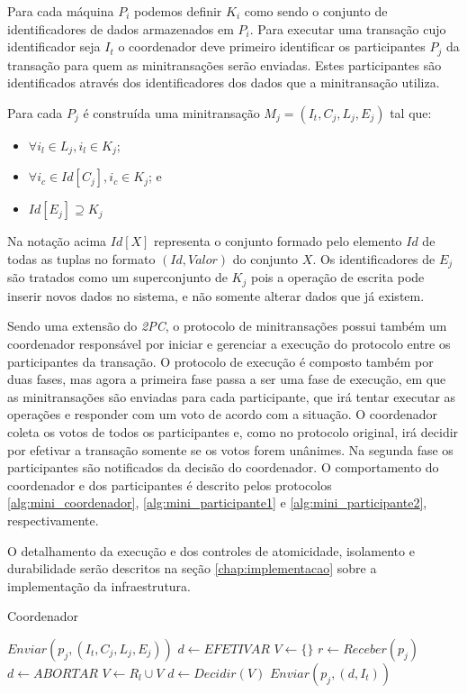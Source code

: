 \documentclass[11pt,twoside,a4paper]{book}
\begin{document}
Para cada máquina \(P_i\) podemos definir \(K_i\) como sendo o conjunto de identificadores de dados armazenados em \(P_i\). Para executar uma transação cujo identificador seja \(I_t\) o coordenador deve primeiro identificar os participantes \(P_j\) da transação para quem as minitransações serão enviadas. Estes participantes são identificados através dos identificadores dos dados que a minitransação utiliza.

Para cada \(P_j\) é construída uma minitransação \(M_j = (I_t, C_j, L_j, E_j)\) tal que:

\begin{itemize}
\item $\forall i_l \in L_j, i_l \in K_j$;
\item $\forall i_c \in Id[C_j], i_c \in K_j$; e
\item $Id[E_j] \supseteq K_j$
\end{itemize}

Na notação acima $Id[X]$ representa o conjunto formado pelo elemento $Id$ de todas as tuplas no formato $(Id, Valor)$ do conjunto $X$. Os identificadores de $E_j$ são tratados como um superconjunto de $K_j$ pois a operação de escrita pode inserir novos dados no sistema, e não somente alterar dados que já existem.

Sendo uma extensão do \emph{2PC}, o protocolo de minitransações possui também um coordenador responsável por iniciar e gerenciar a execução do protocolo entre os participantes da transação. O protocolo de execução é composto também por duas fases, mas agora a primeira fase passa a ser uma fase de execução, em que as minitransações são enviadas para cada participante, que irá tentar executar as operações e responder com um voto de acordo com a situação. O coordenador coleta os votos de todos os participantes e, como no protocolo original, irá decidir por efetivar a transação somente se os votos forem unânimes. Na segunda fase os participantes são notificados da decisão do coordenador. O comportamento do coordenador e dos participantes é descrito pelos protocolos \ref{alg:mini_coordenador}, \ref{alg:mini_participante1} e \ref{alg:mini_participante2}, respectivamente.

O detalhamento da execução e dos controles de atomicidade, isolamento e durabilidade serão descritos na seção \ref{chap:implementacao} sobre a implementação da infraestrutura.

\begin{algorithm}
\caption{Coordenador}
\label{alg:mini_coordenador}
\begin{algorithmic}[1]
	\State $Enviar(p_j, (I_t, C_j, L_j, E_j))$
\EndFor
\State $d \gets EFETIVAR$
\State $V \gets \{\}$
	\State $r \gets Receber(p_j)$
		\State $d \gets ABORTAR$
	\Else
		$V \gets  R_l \cup V$
	\EndIf
\EndFor
{}
	\State $d \gets Decidir(V)$
\EndIf
{}
	\State $Enviar(p_j, (d, I_t))$
\EndFor
\end{algorithmic}
\end{algorithm}
\end{document}
